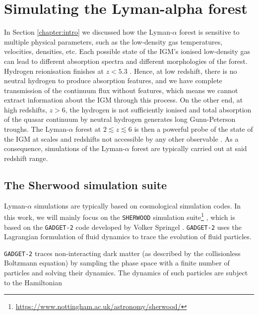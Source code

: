 \chapter{Simulating the Lyman-alpha forest} \label{chap:sherwood}
In Section \ref{chapter:intro} we discussed how the Lyman-$\alpha$ forest is sensitive to multiple physical parameters, such as the low-density gas temperatures, velocities, densities, etc. Each possible state of the IGM's ionised low-density gas can lead to different absorption spectra and different morphologies of the forest. Hydrogen reionisation finishes at $z<5.3$ \cite{Bosman_2022}. Hence, at low redshift, there is no neutral hydrogen to produce absorption features, and we have complete transmission of the continuum flux without features, which means we cannot extract information about the IGM through this process. On the other end, at high redshifts, $z>6$, the hydrogen is not sufficiently ionised and total absorption of the quasar continuum by neutral hydrogen generates long Gunn-Peterson troughs. The Lyman-$\alpha$ forest at $2\lesssim z\lesssim 6$ is then a powerful probe of the state of the IGM at scales and redshifts not accessible by any other observable \cite{Hernquist__1996}. As a consequence, simulations of the Lyman-$\alpha$ forest are typically carried out at said redshift range.














\section{The Sherwood simulation suite}\label{sec:sherwood suite}
Lyman-$\alpha$ simulations are typically based on cosmological simulation codes.
In this work, we will mainly focus on the \texttt{SHERWOOD} simulation suite\footnote{\url{https://www.nottingham.ac.uk/astronomy/sherwood/}} \cite{Bolton_2016}, which is based on the \texttt{GADGET-2} code developed by Volker Springel \cite{Springel_2005}. \texttt{GADGET-2} uses the Lagrangian formulation of fluid dynamics to trace the evolution of fluid particles.


\texttt{GADGET-2} traces non-interacting dark matter (as described by the collisionless Boltzmann equation) by sampling the phase space with a finite number of particles and solving their dynamics. The dynamics of such particles are subject to the Hamiltonian

